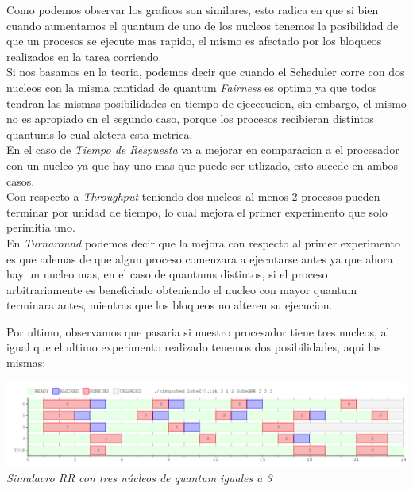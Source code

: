 Como podemos observar los graficos son similares, esto radica en que si bien cuando aumentamos el quantum de uno de los nucleos tenemos la posibilidad de que un procesos se ejecute mas rapido, el mismo es afectado por los bloqueos realizados en la tarea corriendo.\\
Si nos basamos en la teoria, podemos decir que cuando el Scheduler corre con dos nucleos con la misma cantidad de quantum \textit{Fairness} es optimo ya que todos tendran las mismas posibilidades en tiempo de ejececucion, sin embargo, el mismo no es apropiado en el segundo caso, porque los procesos recibieran distintos quantums lo cual aletera esta metrica.\\
En el caso de \textit{Tiempo de Respuesta} va a mejorar en comparacion a el procesador con un nucleo ya que hay uno mas que puede ser utlizado, esto sucede en ambos casos.\\
Con respecto a \textit{Throughput} teniendo dos nucleos al menos 2 procesos pueden terminar por unidad de tiempo, lo cual mejora el primer experimento que solo perimitia uno.\\
En \textit{Turnaround} podemos decir que la mejora con respecto al primer experimento es que ademas de que algun proceso comenzara a ejecutarse antes ya que ahora  hay un nucleo mas, en el caso de quantums distintos, si el proceso arbitrariamente es beneficiado obteniendo el nucleo con mayor quantum terminara antes, mientras que los bloqueos no alteren su ejecucion.

\vspace{1 cm}
Por ultimo, observamos que pasaria si nuestro procesador tiene tres nucleos, al igual que el ultimo experimento realizado tenemos dos posibilidades, aqui las mismas:

\vspace{\baselineskip}
\begin{center}
\includegraphics[scale=0.45]{../tp1/Test/resEj7Co3.png}
\\
\vspace{1pt}
\footnotesize\textit{Simulacro RR con tres n\'ucleos de quantum iguales a 3}
\end{center}
\vspace{\baselineskip}

